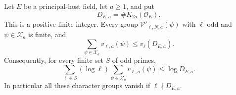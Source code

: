 \begin{srproposition}\label{prop:sr-common-K-integer}
Let \(E\) be a principal-host field, let \(a\geq1\), and put
\[
                       D_{E,a}=\#K_{2a}(\mathcal O_E).
\]
This is a positive finite integer.
Every group \(\mathcal V'_{\ell,N,a}(\psi)\) with
\(\ell\) odd and \(\psi\in\mathcal X_a\) is finite, and
\begin{equation}\label{eq:sr-common-K-integer}
       \sum_{\psi\in\mathcal X_a}v_{\ell,a}(\psi)
                            \leq v_\ell(D_{E,a}).
\end{equation}
Consequently, for every finite set \(S\) of odd primes,
\begin{equation}\label{eq:sr-common-K-sum}
 \sum_{\ell\in S}(\log\ell)
       \sum_{\psi\in\mathcal X_a}v_{\ell,a}(\psi)
                             \leq\log D_{E,a}.
\end{equation}
In particular all these character groups vanish if
\(\ell\nmid D_{E,a}\).
\end{srproposition}

